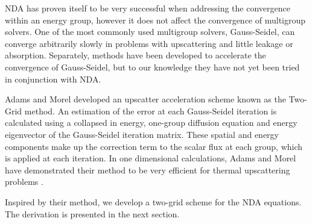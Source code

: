 NDA has proven itself to be very successful when addressing the convergence within an energy group, however it does not affect the convergence of multigroup solvers. One of the most commonly used multigroup solvers, Gauss-Seidel, can converge arbitrarily slowly in problems with upscattering and little leakage or absorption. Separately, methods have been developed to accelerate the convergence of Gauss-Seidel, but to our knowledge they have not yet been tried in conjunction with NDA. 

Adams and Morel developed an upscatter acceleration scheme known as the Two-Grid method. An estimation of the error at each Gauss-Seidel iteration is calculated using a collapsed in energy, one-group diffusion equation and energy eigenvector of the Gauss-Seidel iteration matrix. These spatial and energy components make up the correction term to the scalar flux at each group, which is applied at each iteration. In one dimensional calculations, Adams and Morel have demonstrated their method to be very efficient for thermal upscattering problems \cite{morel-upscat}.

Inspired by their method, we develop a two-grid scheme for the NDA equations. The derivation is presented in the next section. 